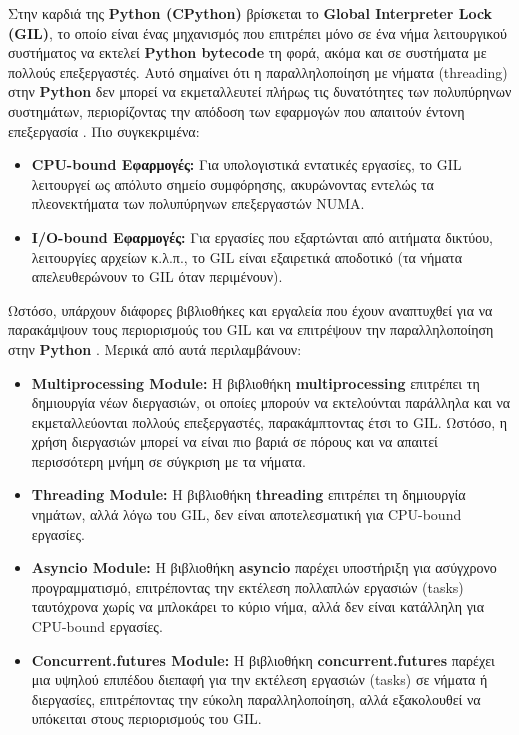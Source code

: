 Στην καρδιά της \textbf{Python (CPython)} βρίσκεται το \textbf{Global Interpreter Lock (GIL)}, το οποίο είναι ένας μηχανισμός που επιτρέπει μόνο σε ένα νήμα λειτουργικού συστήματος να εκτελεί \textbf{Python bytecode} τη φορά, ακόμα και σε συστήματα με πολλούς επεξεργαστές. Αυτό σημαίνει ότι η παραλληλοποίηση με νήματα (threading) στην \textbf{Python} δεν μπορεί να εκμεταλλευτεί πλήρως τις δυνατότητες των πολυπύρηνων συστημάτων, περιορίζοντας την απόδοση των εφαρμογών που απαιτούν έντονη επεξεργασία \cite{rapidfork2023gil, gross2023pep703, ruys2024deep}. Πιο συγκεκριμένα:

\begin{itemize}
    \item \textbf{CPU-bound Εφαρμογές:} Για υπολογιστικά εντατικές εργασίες, το GIL λειτουργεί ως απόλυτο σημείο συμφόρησης, ακυρώνοντας εντελώς τα πλεονεκτήματα των πολυπύρηνων επεξεργαστών NUMA.
    \item \textbf{I/O-bound Εφαρμογές:} Για εργασίες που εξαρτώνται από αιτήματα δικτύου, λειτουργίες αρχείων κ.λ.π., το GIL είναι εξαιρετικά αποδοτικό (τα νήματα απελευθερώνουν το GIL όταν περιμένουν).
\end{itemize}

Ωστόσο, υπάρχουν διάφορες βιβλιοθήκες και εργαλεία που έχουν αναπτυχθεί για να παρακάμψουν τους περιορισμούς του GIL και να επιτρέψουν την παραλληλοποίηση στην \textbf{Python} \cite{adewole2026concurrency}. Μερικά από αυτά περιλαμβάνουν:

\begin{itemize}
    \item \textbf{Multiprocessing Module:} Η βιβλιοθήκη \textbf{multiprocessing} επιτρέπει τη δημιουργία νέων διεργασιών, οι οποίες μπορούν να εκτελούνται παράλληλα και να εκμεταλλεύονται πολλούς επεξεργαστές, παρακάμπτοντας έτσι το GIL. Ωστόσο, η χρήση διεργασιών μπορεί να είναι πιο βαριά σε πόρους και να απαιτεί περισσότερη μνήμη σε σύγκριση με τα νήματα.
    \item \textbf{Threading Module:} Η βιβλιοθήκη \textbf{threading} επιτρέπει τη δημιουργία νημάτων, αλλά λόγω του GIL, δεν είναι αποτελεσματική για CPU-bound εργασίες.
    \item \textbf{Asyncio Module:} Η βιβλιοθήκη \textbf{asyncio} παρέχει υποστήριξη για ασύγχρονο προγραμματισμό, επιτρέποντας την εκτέλεση πολλαπλών εργασιών (tasks) ταυτόχρονα χωρίς να μπλοκάρει το κύριο νήμα, αλλά δεν είναι κατάλληλη για CPU-bound εργασίες.
    \item \textbf{Concurrent.futures Module:} Η βιβλιοθήκη \textbf{concurrent.futures} παρέχει μια υψηλού επιπέδου διεπαφή για την εκτέλεση εργασιών (tasks) σε νήματα ή διεργασίες, επιτρέποντας την εύκολη παραλληλοποίηση, αλλά εξακολουθεί να υπόκειται στους περιορισμούς του GIL. 
\end{itemize}